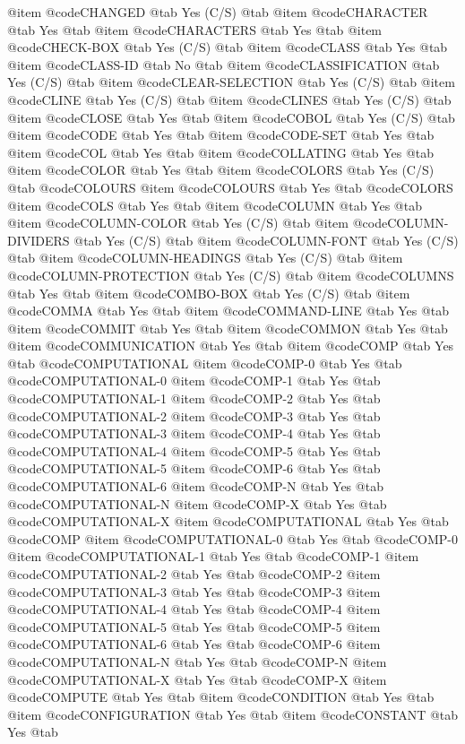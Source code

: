 @item @code{CHANGED} @tab Yes	(C/S) @tab 
@item @code{CHARACTER} @tab Yes @tab 
@item @code{CHARACTERS} @tab Yes @tab 
@item @code{CHECK-BOX} @tab Yes	(C/S) @tab 
@item @code{CLASS} @tab Yes @tab 
@item @code{CLASS-ID} @tab No @tab 
@item @code{CLASSIFICATION} @tab Yes	(C/S) @tab 
@item @code{CLEAR-SELECTION} @tab Yes	(C/S) @tab 
@item @code{CLINE} @tab Yes	(C/S) @tab 
@item @code{CLINES} @tab Yes	(C/S) @tab 
@item @code{CLOSE} @tab Yes @tab 
@item @code{COBOL} @tab Yes	(C/S) @tab 
@item @code{CODE} @tab Yes @tab 
@item @code{CODE-SET} @tab Yes @tab 
@item @code{COL} @tab Yes @tab 
@item @code{COLLATING} @tab Yes @tab 
@item @code{COLOR} @tab Yes @tab 
@item @code{COLORS} @tab Yes	(C/S) @tab @code{COLOURS}
@item @code{COLOURS} @tab Yes @tab @code{COLORS}
@item @code{COLS} @tab Yes @tab 
@item @code{COLUMN} @tab Yes @tab 
@item @code{COLUMN-COLOR} @tab Yes	(C/S) @tab 
@item @code{COLUMN-DIVIDERS} @tab Yes	(C/S) @tab 
@item @code{COLUMN-FONT} @tab Yes	(C/S) @tab 
@item @code{COLUMN-HEADINGS} @tab Yes	(C/S) @tab 
@item @code{COLUMN-PROTECTION} @tab Yes	(C/S) @tab 
@item @code{COLUMNS} @tab Yes @tab 
@item @code{COMBO-BOX} @tab Yes	(C/S) @tab 
@item @code{COMMA} @tab Yes @tab 
@item @code{COMMAND-LINE} @tab Yes @tab 
@item @code{COMMIT} @tab Yes @tab 
@item @code{COMMON} @tab Yes @tab 
@item @code{COMMUNICATION} @tab Yes @tab 
@item @code{COMP} @tab Yes @tab @code{COMPUTATIONAL}
@item @code{COMP-0} @tab Yes @tab @code{COMPUTATIONAL-0}
@item @code{COMP-1} @tab Yes @tab @code{COMPUTATIONAL-1}
@item @code{COMP-2} @tab Yes @tab @code{COMPUTATIONAL-2}
@item @code{COMP-3} @tab Yes @tab @code{COMPUTATIONAL-3}
@item @code{COMP-4} @tab Yes @tab @code{COMPUTATIONAL-4}
@item @code{COMP-5} @tab Yes @tab @code{COMPUTATIONAL-5}
@item @code{COMP-6} @tab Yes @tab @code{COMPUTATIONAL-6}
@item @code{COMP-N} @tab Yes @tab @code{COMPUTATIONAL-N}
@item @code{COMP-X} @tab Yes @tab @code{COMPUTATIONAL-X}
@item @code{COMPUTATIONAL} @tab Yes @tab @code{COMP}
@item @code{COMPUTATIONAL-0} @tab Yes @tab @code{COMP-0}
@item @code{COMPUTATIONAL-1} @tab Yes @tab @code{COMP-1}
@item @code{COMPUTATIONAL-2} @tab Yes @tab @code{COMP-2}
@item @code{COMPUTATIONAL-3} @tab Yes @tab @code{COMP-3}
@item @code{COMPUTATIONAL-4} @tab Yes @tab @code{COMP-4}
@item @code{COMPUTATIONAL-5} @tab Yes @tab @code{COMP-5}
@item @code{COMPUTATIONAL-6} @tab Yes @tab @code{COMP-6}
@item @code{COMPUTATIONAL-N} @tab Yes @tab @code{COMP-N}
@item @code{COMPUTATIONAL-X} @tab Yes @tab @code{COMP-X}
@item @code{COMPUTE} @tab Yes @tab 
@item @code{CONDITION} @tab Yes @tab 
@item @code{CONFIGURATION} @tab Yes @tab 
@item @code{CONSTANT} @tab Yes @tab 
